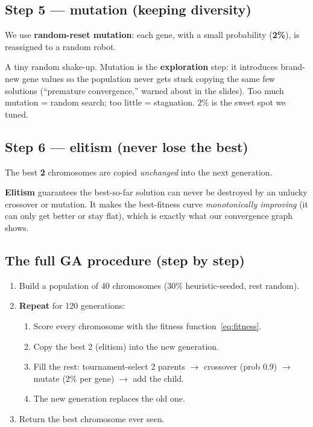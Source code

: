 \documentclass[11pt]{article}
\begin{document}
\subsection{Step 5 --- mutation (keeping diversity)}
We use \textbf{random-reset mutation}: each gene, with a small probability
(\textbf{2\%}), is reassigned to a random robot.

\begin{intuition}
A tiny random shake-up. Mutation is the \textbf{exploration} step: it introduces
brand-new gene values so the population never gets stuck copying the same few
solutions (``premature convergence,'' warned about in the slides). Too much
mutation = random search; too little = stagnation. $2\%$ is the sweet spot we
tuned.
\end{intuition}

\subsection{Step 6 --- elitism (never lose the best)}
The best \textbf{2} chromosomes are copied \emph{unchanged} into the next
generation.

\begin{whybox}
\textbf{Elitism} guarantees the best-so-far solution can never be destroyed by an
unlucky crossover or mutation. It makes the best-fitness curve
\emph{monotonically improving} (it can only get better or stay flat), which is
exactly what our convergence graph shows.
\end{whybox}

\subsection{The full GA procedure (step by step)}
\begin{enumerate}[nosep]
  \item Build a population of 40 chromosomes (30\% heuristic-seeded, rest random).
  \item \textbf{Repeat} for 120 generations:
  \begin{enumerate}[nosep]
    \item Score every chromosome with the fitness function~\eqref{eq:fitness}.
    \item Copy the best 2 (elitism) into the new generation.
    \item Fill the rest: tournament-select 2 parents $\to$ crossover (prob 0.9)
          $\to$ mutate (2\% per gene) $\to$ add the child.
    \item The new generation replaces the old one.
  \end{enumerate}
  \item Return the best chromosome ever seen.
\end{enumerate}
\end{document}
